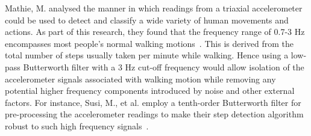 \documentclass[main.tex]{subfiles}
\begin{document}
Mathie, M. analysed the manner in which readings from a triaxial accelerometer could be used to detect and classify a wide variety of human movements and actions. As part of this research, they found that the frequency range of 0.7-3 Hz encompasses most people's normal walking motions~\cite[p.248]{walkingFrequency}. This is derived from the total number of steps usually taken per minute while walking. Hence using a low-pass Butterworth filter with a 3 Hz cut-off frequency would allow isolation of the accelerometer signals associated with walking motion while removing any potential higher frequency components introduced by noise and other external factors. For instance, Susi, M., et al. employ a tenth-order Butterworth filter for pre-processing the accelerometer readings to make their step detection algorithm robust to such high frequency signals~\cite[p.1552]{susi2013motion}.  
\end{document}
